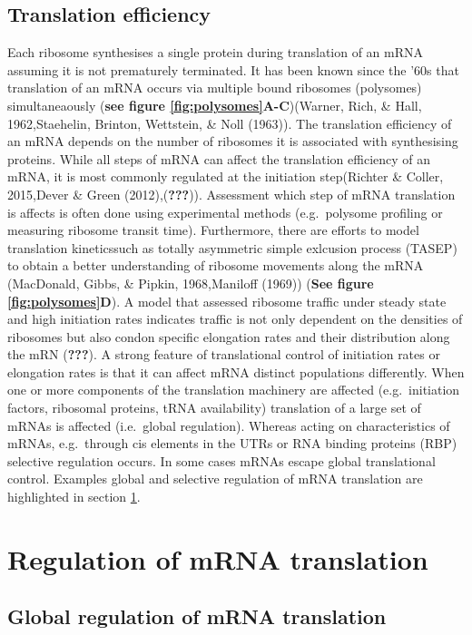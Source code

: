 \documentclass[12pt,openany]{book}
\begin{document}
\subsection{Translation efficiency}

Each ribosome synthesises a single protein during translation of an mRNA
assuming it is not prematurely terminated. It has been known since the
'60s that translation of an mRNA occurs via multiple bound ribosomes
(polysomes) simultaneaously (\textbf{see figure
\ref{fig:polysomes}A-C})(Warner, Rich, \& Hall, 1962,Staehelin, Brinton,
Wettstein, \& Noll (1963)). The translation efficiency of an mRNA
depends on the number of ribosomes it is associated with synthesising
proteins. While all steps of mRNA can affect the translation efficiency
of an mRNA, it is most commonly regulated at the initiation step(Richter
\& Coller, 2015,Dever \& Green (2012),({\textbf{???}})). Assessment
which step of mRNA translation is affects is often done using
experimental methods (e.g.~polysome profiling or measuring ribosome
transit time). Furthermore, there are efforts to model translation
kineticssuch as totally asymmetric simple exlcusion process (TASEP) to
obtain a better understanding of ribosome movements along the mRNA
(MacDonald, Gibbs, \& Pipkin, 1968,Maniloff (1969)) (\textbf{See figure
\ref{fig:polysomes}D}). A model that assessed ribosome traffic under
steady state and high initiation rates indicates traffic is not only
dependent on the densities of ribosomes but also condon specific
elongation rates and their distribution along the mRN ({\textbf{???}}).
A strong feature of translational control of initiation rates or
elongation rates is that it can affect mRNA distinct populations
differently. When one or more components of the translation machinery
are affected (e.g.~initiation factors, ribosomal proteins, tRNA
availability) translation of a large set of mRNAs is affected
(i.e.~global regulation). Whereas acting on characteristics of mRNAs,
e.g.~through cis elements in the UTRs or RNA binding proteins (RBP)
selective regulation occurs. In some cases mRNAs escape global
translational control. Examples global and selective regulation of mRNA
translation are highlighted in section \ref{regmRNA}.

\section{Regulation of mRNA translation} \label{regmRNA}

\subsection{Global regulation of mRNA translation}
\end{document}
